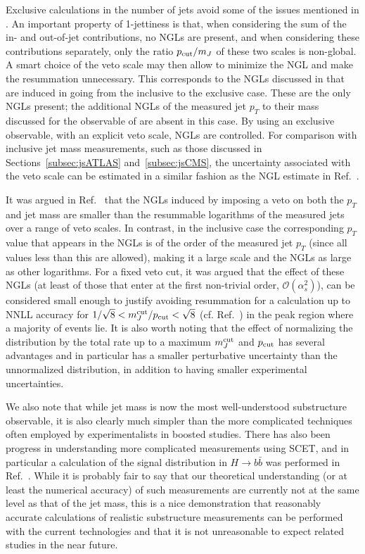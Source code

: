 Exclusive calculations in the number of jets avoid some of the 
issues mentioned in . An important property of 
1-jettiness is that, when considering the sum of the in- and out-of-jet 
contributions, no NGLs are present, and when considering these 
contributions separately, only the ratio $p_{\rm cut} / m_J$ of these two 
scales is non-global. A smart choice of the veto scale may then allow
to minimize the NGL and make the resummation unnecessary.
This corresponds to the NGLs discussed in 
 that are induced in going from the inclusive to the 
exclusive case. These are the only NGLs present; 
the additional NGLs of the measured jet $p_T$ to their mass discussed 
for the observable of  are absent in this case.
By using an exclusive observable, with an explicit veto scale, NGLs
are controlled. For comparison with inclusive jet mass measurements,
such as those discussed in Sections~\ref{subsec:jsATLAS} and~\ref{subsec:jsCMS},
the uncertainty associated with the veto scale can be estimated in
a similar fashion as the NGL estimate in Ref.~\cite{Chien:2012ur}.

It was argued in Ref.~\cite{Jouttenus:2013hs} that the NGLs induced 
by imposing a veto on both the $p_T$ and jet mass are smaller 
than the resummable logarithms of the measured jets over a range of veto 
scales. In contrast,
in the inclusive case the corresponding $p_T$ value that appears in the 
NGLs is of the order of the measured jet $p_T$ (since all values less 
than this are allowed), making it a large scale and the NGLs as large 
as other logarithms. For a fixed veto cut, it was argued that the effect 
of these NGLs (at least of those that enter at the first non-trivial 
order, $\mathcal{O}(\alpha_s^2)$), can be considered small enough to 
justify avoiding resummation for a calculation up to NNLL accuracy 
for $1/\sqrt{8} < m_J^{\rm cut}/p_{\rm cut} < \sqrt{8}$ (cf. 
Ref.~\cite{Hornig:2011iu}) in the peak region where a majority 
of events lie. It is also worth noting that the effect of normalizing 
the distribution by the total rate up to a maximum $m_J^{\rm cut}$ and 
$p_{\rm cut}$ has several advantages and in particular has a smaller 
perturbative uncertainty than the unnormalized distribution, in 
addition to having smaller experimental uncertainties.



We also note that while jet mass is now the most well-understood 
substructure observable, it is also clearly much simpler than the 
more complicated techniques often employed by experimentalists in 
boosted studies. There has also been progress in understanding 
more complicated measurements using SCET, and in particular a 
calculation of the signal distribution in $H \to b \bar{b}$ was 
performed in Ref.~\cite{Feige:2012vc}. While it is probably fair 
to say that our theoretical understanding (or at least the numerical 
accuracy) of such measurements are currently not at the same level 
as that of the jet mass, this is a nice demonstration that reasonably 
accurate calculations of realistic substructure measurements can be 
performed with the current technologies and that it is not 
unreasonable to expect related studies in the near future.

